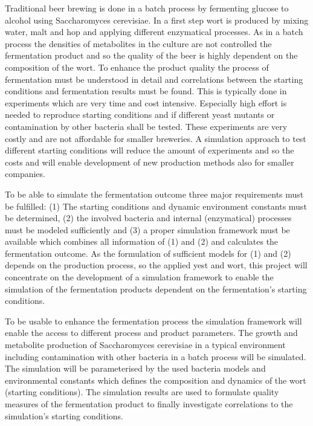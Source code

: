 Traditional beer brewing is done in a batch process by fermenting glucose to alcohol using Saccharomyces cerevisiae. In a first step wort
is produced by mixing water, malt and hop and applying different enzymatical processes. As in a batch process
the densities of metabolites in the culture are not controlled the fermentation product and so the quality of the beer is highly dependent
on the composition of the wort. To enhance the product quality the process of fermentation must be understood in detail and correlations
between the starting conditions and fermentation results must be found. This is typically done in experiments which are very time and cost
intensive. Especially high effort is needed to reproduce starting conditions and if different yeast mutants or contamination by other 
bacteria shall be tested. These experiments are very costly and are not affordable for smaller breweries. A simulation approach to test
different starting conditions will reduce the amount of experiments and so the costs and will enable development of new production methods
also for smaller companies.

To be able to simulate the fermentation outcome three major requirements must be fulfilled: (1) The starting conditions and dynamic environment
constants must be determined, (2) the involved bacteria and internal (enzymatical) processes must be modeled sufficiently and (3) a proper
simulation framework must be available which combines all information of (1) and (2) and calculates the fermentation outcome. As the 
formulation of sufficient models for (1) and (2) depends on the production process, so the applied yest and wort, this project will
concentrate on the development of a simulation framework to enable the simulation of the fermentation products dependent on the fermentation's
starting conditions.

To be usable to enhance the fermentation process the simulation framework will enable the access to different process and product parameters.
The growth and metabolite production of Saccharomyces cerevisiae in a typical environment including contamination with other bacteria in a
batch process will be simulated. The simulation will be parameterised by the used bacteria models and environmental constants which defines
the composition and dynamics of the wort (starting conditions). The simulation results are used to formulate quality measures of the fermentation
product to finally investigate correlations to the simulation's starting conditions.

